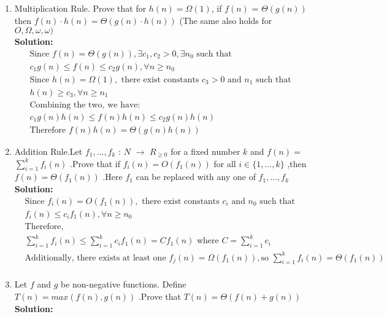 \begin{enumerate}
    \item Multiplication Rule. Prove that for $h(n)=\Omega(1)$, if $f( n)$ = $\Theta ( g( n) )$ then $f(n)\cdot h(n)=\Theta(g(n)\cdot h(n))$ (The same also holds for $O,\Omega,\omega,\omega)$
    \\\textbf{Solution:}
    \begin{align*}  
        &\text{Since } f(n)=\Theta(g(n)), \exists c_1,c_2>0,\exists n_0 \text{ such that }&\\
        &c_1g(n)\leq f(n)\leq c_2g(n),\forall n\geq n_0&\\
         &\text{Since } h(n)=\Omega(1),\text{ there exist constants }c_3>0 \text{ and } n_1 \text{ such that } &\\       
        &h(n)\geq c_3, \forall n\geq n_1&\\
        &\text{Combining the two, we have: }&\\
        &c_1g(n)h(n)\leq f(n)h(n)\leq c_2 g(n)h(n)&\\
        &\text{Therefore } f(n)h(n)=\Theta(g(n)h(n))&
    \end{align*}
    \item Addition Rule.Let $f_{1}, . . . , f_{k}$ : $N$ $\to$ $R_{\geq 0}$ for a fixed number $k$ and $f(n)=$ $\sum_{i=1}^{k}f_{i}(n)$ .Prove that if $f_{i}(n)=O(f_{1}(n))$ for all $i\in\{1,\ldots,k\}$ ,then $f(n)=\Theta(f_{1}(n))$ .Here $f_{1}$ can be replaced with any one of $f_{1},...,f_{k}$
    \\\textbf{Solution:}
    \begin{align*}
        &\text{Since }f_i(n)=O(f_1(n)),\text{ there exist constants }c_i \text{ and } n_0 \text{ such that }&\\
        &f_i(n)\leq c_i f_1(n),\forall n\geq n_0&\\
        &\text{Therefore, }&\\
        &\sum_{i=1}^{k}f_i(n)\leq\sum_{i=1}^{k}c_i f_1(n)=Cf_1(n) \text{ where }C=\sum_{i=1}^{k}c_i &\\
        &\text{Additionally, there exists at least one }f_j(n)=\Omega(f_1(n)),\text{so }\sum_{i=1}^{k}f_i(n)=\Theta(f_1(n))&\\
    \end{align*}
    \item Let $f$ and $g$ be non-negative functions. Define $T(n)=max(f(n),g(n))$ .Prove that $T(n)=\Theta(f(n)+g(n))$
    \\\textbf{Solution:}
    \begin{align*}

\end{align*}
\end{enumerate}
